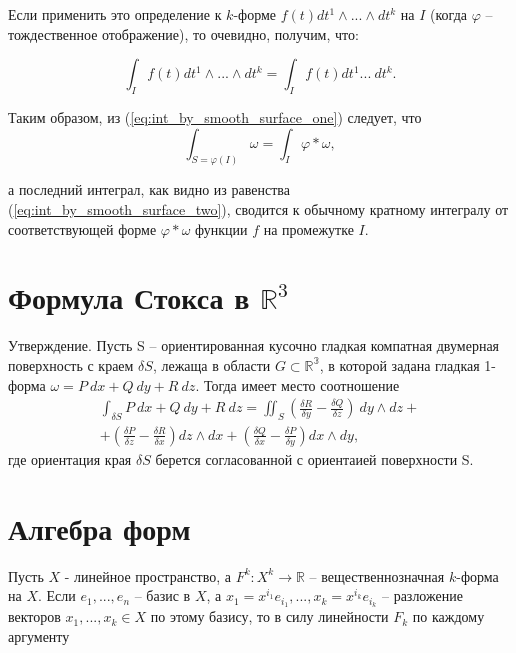 \documentclass[a4paper, 12pt]{article} %
\begin{document}
Если применить это определение к $k$-форме $f(t) dt^1 \land ...\land dt^k$ на $I$ (когда $\varphi$ -- тождественное отображение), то очевидно, получим, что:

\begin{equation}
    \int_I f(t) dt^1 \land ... \land dt^k = \int_I f(t) dt^1 ... \ dt^k.
    \label{eq:int_by_smooth_surface_two}
\end{equation}

Таким образом, из (\ref{eq:int_by_smooth_surface_one}) следует, что
\begin{equation}
    \int_{S = \varphi(I)} \omega = \int_I \varphi * \omega,
\end{equation}

а последний интеграл, как видно из равенства (\ref{eq:int_by_smooth_surface_two}), сводится к обычному кратному интегралу от соответствующей форме $\varphi * \omega$ функции $f$ на промежутке $I$.

\clearpage
\section*{Формула Стокса в $\mathbb{R}^3$}
Утверждение. Пусть S -- ориентированная кусочно гладкая компатная двумерная поверхность с краем $\delta S$, лежаща в области $G \subset \mathbb{R^3}$, в которой задана гладкая 1-форма $\omega = P\ dx + Q\ dy + R\ dz$. Тогда имеет место соотношение
\begin{eqnarray*}
    \int_{\delta S} P\ dx + Q\ dy + R\ dz = \iint_S \left( \frac{\delta R}{\delta y} - \frac{\delta Q}{\delta z} \right) \ dy \land dz + \\ + \left(\frac{\delta P}{\delta z} - \frac{\delta R}{\delta x}\right) dz \land dx + \left(\frac{\delta Q}{\delta x} - \frac{\delta P}{\delta y}\right) dx \land dy,
\end{eqnarray*}
где ориентация края $\delta S$ берется согласованной с ориентаией поверхности S.

\clearpage

\section*{Алгебра форм}
Пусть $X$ - линейное пространство, а $F^k : X^k \to \mathbb{R}$ -- вещественнозначная $k$-форма на $X$. Если $e_1, ..., e_n$ -- базис в $X$, а $x_1 = x^{i_1} e_{i_1}, ..., x_k = x^{i_k} e_{i_k}$ -- разложение векторов $x_1, ..., x_k \in X$ по этому базису, то в силу линейности $F_k$ по каждому аргументу
\end{document}
